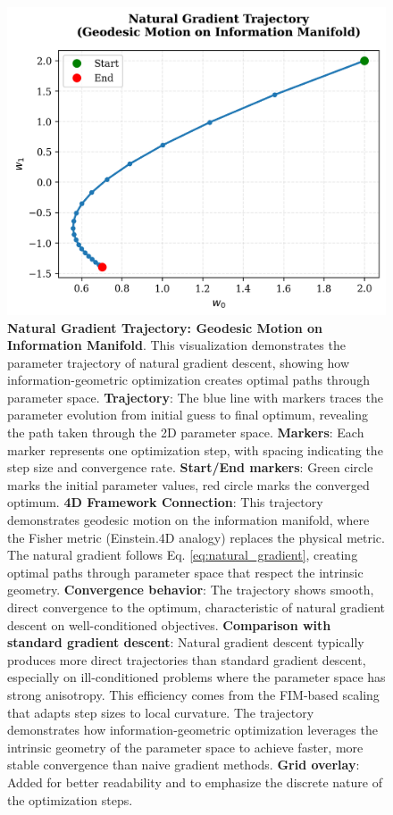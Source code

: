 \documentclass[
  10pt,
]{article}
\begin{document}
\begin{figure}
\centering
\includegraphics{../output/figures/natural_gradient_path.png}
\caption{\textbf{Natural Gradient Trajectory: Geodesic Motion on
Information Manifold}. This visualization demonstrates the parameter
trajectory of natural gradient descent, showing how
information-geometric optimization creates optimal paths through
parameter space. \textbf{Trajectory}: The blue line with markers traces
the parameter evolution from initial guess to final optimum, revealing
the path taken through the 2D parameter space. \textbf{Markers}: Each
marker represents one optimization step, with spacing indicating the
step size and convergence rate. \textbf{Start/End markers}: Green circle
marks the initial parameter values, red circle marks the converged
optimum. \textbf{4D Framework Connection}: This trajectory demonstrates
geodesic motion on the information manifold, where the Fisher metric
(Einstein.4D analogy) replaces the physical metric. The natural gradient
follows Eq. \eqref{eq:natural_gradient}, creating optimal paths through
parameter space that respect the intrinsic geometry. \textbf{Convergence
behavior}: The trajectory shows smooth, direct convergence to the
optimum, characteristic of natural gradient descent on well-conditioned
objectives. \textbf{Comparison with standard gradient descent}: Natural
gradient descent typically produces more direct trajectories than
standard gradient descent, especially on ill-conditioned problems where
the parameter space has strong anisotropy. This efficiency comes from
the FIM-based scaling that adapts step sizes to local curvature. The
trajectory demonstrates how information-geometric optimization leverages
the intrinsic geometry of the parameter space to achieve faster, more
stable convergence than naive gradient methods. \textbf{Grid overlay}:
Added for better readability and to emphasize the discrete nature of the
optimization steps.}
\end{figure}
\end{document}
